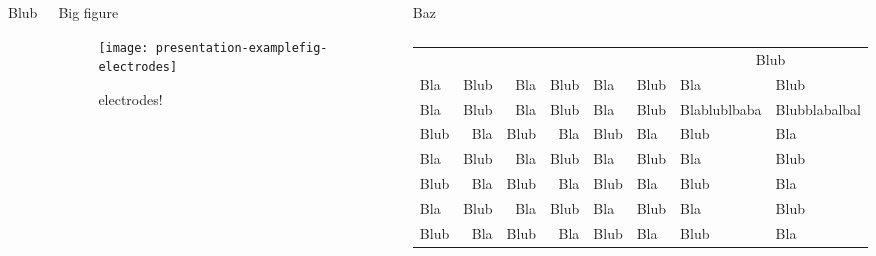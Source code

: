 \documentclass[english,xcolor=table,t
]{beamer}
\begin{document}
\begin{frame}
\begin{columns}
\begin{block}{Blub}
\begin{columns}

\begin{columns}


\lipsum[3]


\lipsum[4]

\end{columns}


\lipsum[5]

\end{columns}

\vskip0.7cm

\end{block}


\begin{block}{Big figure}

\begin{figure}
\texttt{[image: presentation-examplefig-electrodes]}
\caption{electrodes!}
\end{figure}

\end{block}

\begin{block}{Baz}

\lipsum[6-7]


\begin{table}
    \begin{tabular}{lrrrllll}
            \rowcolor{kuldark!20}
                &     &                     &         &      &          &
                \multicolumn{2}{c}{\cellcolor{kuldark!20}Blub} \\
        Bla & Blub & Bla & Blub & Bla & Blub &
        Bla & Blub \\
        Bla & Blub & Bla & Blub & Bla & Blub & Blablublbaba & Blubblabalbal \\
        Blub & Bla & Blub & Bla & Blub & Bla & Blub & Bla \\
        Bla & Blub & Bla & Blub & Bla & Blub & Bla & Blub \\
        Blub & Bla & Blub & Bla & Blub & Bla & Blub & Bla \\
        Bla & Blub & Bla & Blub & Bla & Blub & Bla & Blub \\
        Blub & Bla & Blub & Bla & Blub & Bla & Blub & Bla \\
    \end{tabular}
    \caption{\lipsum[9]}
    \label{tab:blub}
\end{table}


\end{block}
\end{columns}
\end{frame}
\end{document}

